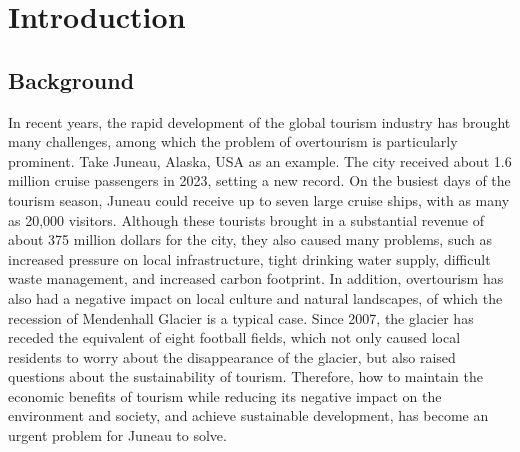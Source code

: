 \documentclass[12pt]{article}  %
\begin{document}
 \maketitle  %
 
 \tableofcontents  %
 
 
 \section{Introduction}
 \subsection{Background}
In recent years, the rapid development of the global tourism industry has brought many challenges, among which the problem of overtourism is particularly prominent. Take Juneau, Alaska, USA as an example. The city received about 1.6 million cruise passengers in 2023, setting a new record. On the busiest days of the tourism season, Juneau could receive up to seven large cruise ships, with as many as 20,000 visitors. Although these tourists brought in a substantial revenue of about 375 million dollars for the city, they also caused many problems, such as increased pressure on local infrastructure, tight drinking water supply, difficult waste management, and increased carbon footprint. In addition, overtourism has also had a negative impact on local culture and natural landscapes, of which the recession of Mendenhall Glacier is a typical case. Since 2007, the glacier has receded the equivalent of eight football fields, which not only caused local residents to worry about the disappearance of the glacier, but also raised questions about the sustainability of tourism. Therefore, how to maintain the economic benefits of tourism while reducing its negative impact on the environment and society, and achieve sustainable development, has become an urgent problem for Juneau to solve.
 
\end{document}
